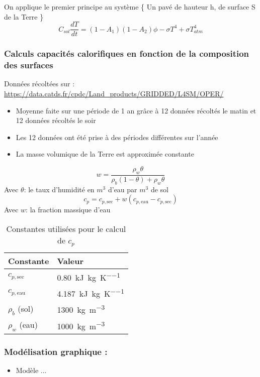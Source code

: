 \documentclass[a4paper,12pt]{article}
\begin{document}
On applique le premier principe au système \{ Un pavé de hauteur h, de surface S de la Terre \}
\ \ 
\[
C_{sol} \frac{dT}{dt} =(1-A_1)(1-A_2)\phi-\sigma T^4+\sigma T_{atm}^4
\]

\subsubsection*{Calculs capacités calorifiques en fonction de la composition des surfaces}
Données récoltées sur : 
\url{https://data.catds.fr/cpdc/Land_products/GRIDDED/L4SM/OPER/}

\begin{itemize}
    \item Moyenne faite sur une période de 1 an grâce à 12 données récoltés le matin et 12 données récoltés le soir 
    \item Les 12 données ont été prise à des périodes différentes sur l'année 
    \item La masse volumique de la Terre est approximée constante 
\end{itemize}
\[
w = \frac{\rho_w \theta}{\rho_b (1 - \theta) + \rho_w \theta}
\]
Avec \(\theta\): le taux d'humidité en \(m^3\) d'eau par \(m^3\) de sol 
\[
c_p = c_{p,\text{sec}} + w (c_{p,\text{eau}} - c_{p,\text{sec}})
\]
Avec \(w\): la fraction massique d'eau 
\begin{table}[h!]
\centering
\begin{tabular}{ll}
\textbf{Constante} & \textbf{Valeur} \\
\hline
$c_{p,\text{sec}}$ & \SI{0.80}{\kilo\joule\per\kilogram\per\kelvin} \\
$c_{p,\text{eau}}$ & \SI{4.187}{\kilo\joule\per\kilogram\per\kelvin} \\
$\rho_b$ (sol) & \SI{1300}{\kilogram\per\cubic\metre} \\
$\rho_w$ (eau) & \SI{1000}{\kilogram\per\cubic\metre} \\
\end{tabular}
\caption*{Constantes utilisées pour le calcul de $c_p$}
\end{table}














\subsubsection*{Modélisation graphique :} 
\begin{itemize}
    \item Modèle ...
\end{itemize}
\end{document}
